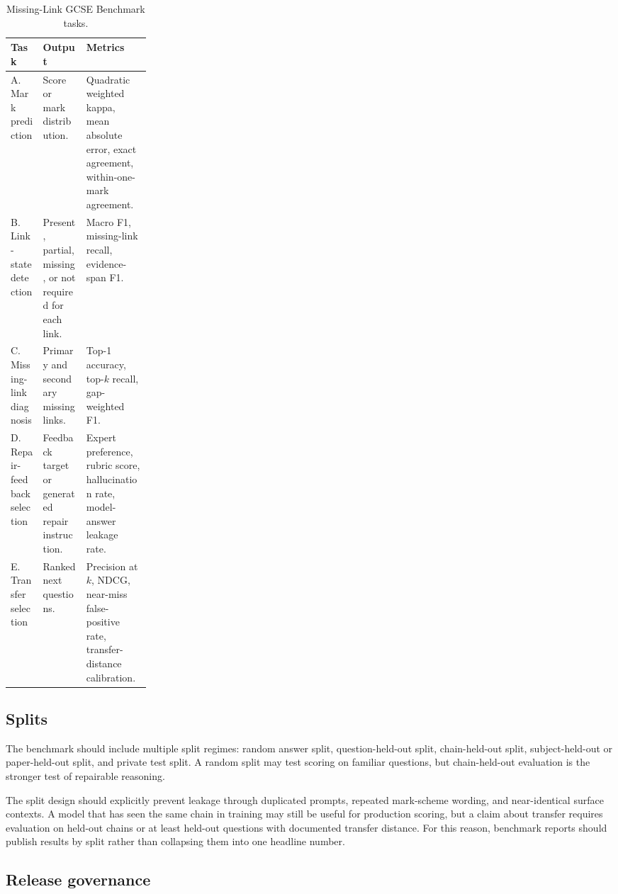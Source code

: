 \documentclass[11pt]{article}
\begin{document}
\begin{table}[H]
\centering
\small
\begin{tabularx}{\linewidth}{L{0.23\linewidth}Y Y}
\toprule
\textbf{Task} & \textbf{Output} & \textbf{Metrics}\\
\midrule
A. Mark prediction & Score or mark distribution. & Quadratic weighted kappa, mean absolute error, exact agreement, within-one-mark agreement.\\
B. Link-state detection & Present, partial, missing, or not required for each link. & Macro F1, missing-link recall, evidence-span F1.\\
C. Missing-link diagnosis & Primary and secondary missing links. & Top-1 accuracy, top-\(k\) recall, gap-weighted F1.\\
D. Repair-feedback selection & Feedback target or generated repair instruction. & Expert preference, rubric score, hallucination rate, model-answer leakage rate.\\
E. Transfer selection & Ranked next questions. & Precision at \(k\), NDCG, near-miss false-positive rate, transfer-distance calibration.\\
\bottomrule
\end{tabularx}
\caption{Missing-Link GCSE Benchmark tasks.}
\label{tab:benchmarktasks}
\end{table}

\subsection{Splits}

The benchmark should include multiple split regimes: random answer split, question-held-out split, chain-held-out split, subject-held-out or paper-held-out split, and private test split. A random split may test scoring on familiar questions, but chain-held-out evaluation is the stronger test of repairable reasoning.

The split design should explicitly prevent leakage through duplicated prompts, repeated mark-scheme wording, and near-identical surface contexts. A model that has seen the same chain in training may still be useful for production scoring, but a claim about transfer requires evaluation on held-out chains or at least held-out questions with documented transfer distance. For this reason, benchmark reports should publish results by split rather than collapsing them into one headline number.

\subsection{Release governance}
\end{document}
